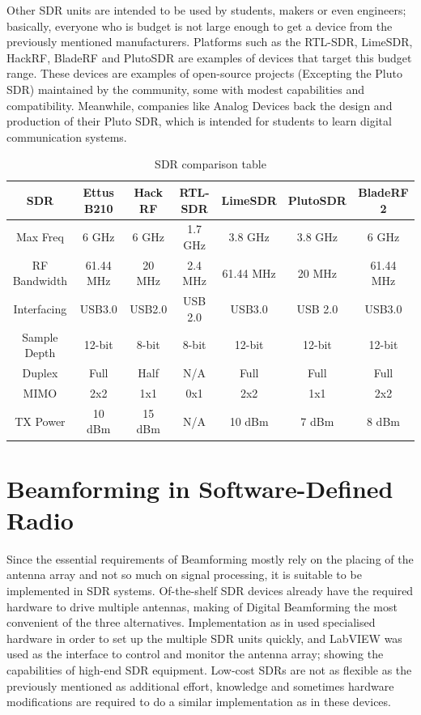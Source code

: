 \documentclass[12pt,a4paper]{report}
\begin{document}
Other SDR units are intended to be used by students, makers or even engineers; basically, everyone who is budget is not large enough to get a device from the previously mentioned manufacturers. Platforms such as the RTL-SDR, LimeSDR, HackRF, BladeRF and PlutoSDR are examples of devices that target this budget range. These devices are examples of open-source projects (Excepting the Pluto SDR) maintained by the community, some with modest capabilities and compatibility. Meanwhile, companies like Analog Devices back the design and production of their Pluto SDR, which is intended for students to learn digital communication systems. 

\begin{table}
\centering
\begin{tabular}{c|c|c|c|c|c|c}
SDR & Ettus B210 & Hack RF & RTL-SDR & LimeSDR & PlutoSDR & BladeRF 2 \\ 
\hline 
Max Freq & 6 GHz & 6 GHz & 1.7 GHz & 3.8 GHz & 3.8 GHz & 6 GHz \\ 
RF Bandwidth & 61.44 MHz & 20 MHz & 2.4 MHz & 61.44 MHz & 20 MHz & 61.44 MHz \\ 
Interfacing & USB3.0 & USB2.0 & USB 2.0 & USB3.0 & USB 2.0 & USB3.0 \\
Sample Depth & 12-bit & 8-bit & 8-bit & 12-bit & 12-bit & 12-bit \\ 
Duplex & Full & Half & N/A & Full & Full & Full \\ 
MIMO & 2x2 & 1x1 & 0x1 & 2x2 & 1x1 & 2x2 \\ 
TX Power & 10 dBm & 15 dBm & N/A & 10 dBm & 7 dBm & 8 dBm \\ 
\end{tabular}
\caption[SDR comparison table.]{SDR comparison table \cite{sdrtable, RTL-SDR.com2020RTL-SDRDatasheet, Nuand2018BladeRFMicro}}
\label{tb:SDRcomp}
\end{table}

\newpage
\section{Beamforming in Software-Defined Radio} \label{back:bf_sdr}
Since the essential requirements of Beamforming mostly rely on the placing of the antenna array and not so much on signal processing, it is suitable to be implemented in SDR systems. Of-the-shelf SDR devices already have the required hardware to drive multiple antennas, making of Digital Beamforming the most convenient of the three alternatives. Implementation as in \cite{Gaydos2018, Nayeri2016} used specialised hardware in order to set up the multiple SDR units quickly, and LabVIEW was used as the interface to control and monitor the antenna array; showing the capabilities of high-end SDR equipment. Low-cost SDRs are not as flexible as the previously mentioned as additional effort, knowledge and sometimes hardware modifications are required to do a similar implementation as \cite{Gaydos2018, Nayeri2016} in these devices.
\end{document}
